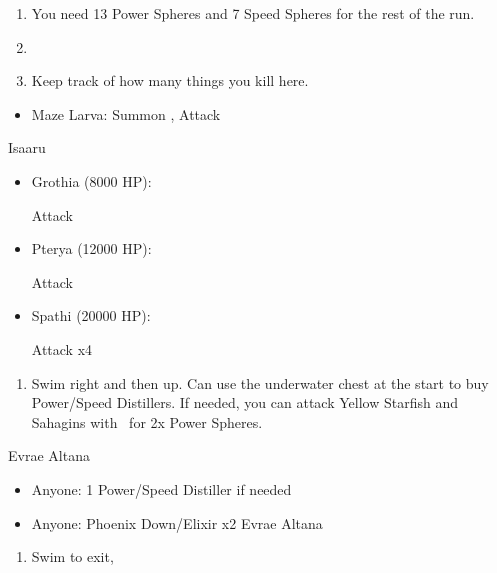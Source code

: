 \begin{enumerate}[resume]
	\item You need 13 Power Spheres and 7 Speed Spheres for the rest of the run.
	\item \save
	\item Keep track of how many things you kill here.
\end{enumerate}
\begin{encounters}
	\begin{itemize}
		\item Maze Larva: Summon \ixion, Attack
	\end{itemize}
\end{encounters}
\bothvfill
\winvfill
\lossvfill
\begin{battle}{Isaaru}
	\begin{itemize}
		\item Grothia (8000 HP):
		      \begin{itemize}
			      \summon{\bahamut}
			      \bahamutf Attack
		      \end{itemize}
		\item Pterya (12000 HP):
		      \begin{itemize}
			      \summon{\bahamut}
			      \bahamutf Attack
		      \end{itemize}
		\item Spathi (20000 HP):
		      \begin{itemize}
			      \summon{\ixion}
			      \ixionf Attack x4
		      \end{itemize}
	\end{itemize}
\end{battle}
\begin{enumerate}[resume]
	\item Swim right and then up. Can use the underwater chest at the start to buy Power/Speed Distillers. If needed, you can attack Yellow Starfish and Sahagins with \tidus\ for 2x Power Spheres.
\end{enumerate}
\begin{battle}{Evrae Altana}
	\begin{itemize}
		\item Anyone: 1 Power/Speed Distiller if needed
		\item Anyone: Phoenix Down/Elixir x2 Evrae Altana
	\end{itemize}
\end{battle}
\begin{enumerate}[resume]
	\item Swim to exit, \sd
\end{enumerate}
\ 
\bothvfill
\ \bothnewline
\bothcb
\ 